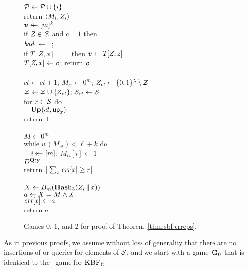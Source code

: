 \begin{figure*}
{  \\[2pt]
    $\mathcal{P} \gets \mathcal{P} \cup \{i\}$\\
    return $\langle M_i, Z_i\rangle$
}
{
  \vspace{-7pt}
  \hfill{}\\[2pt]
    $\boldsymbol{v} \mathrel{\leftarrow\mkern-14mu\leftarrow} [m]^k$\\
    if $Z \in \mathcal{Z}$ and $c = 1$ then \\
    \tab $\textit{bad}_1 \gets 1$; \\
    if $T[Z,x] = \bot$ then $\boldsymbol{v} \gets T[Z,z]$\\
    $T[Z,x] \gets \boldsymbol{v}$; return $\boldsymbol{v}$
  \\[6pt]
  \oraclev{$\REPO(\col)$}\hfill{}\\[2pt]
    $ct \gets ct+1$;
    $M_{ct} \gets 0^m$;
    $Z_{ct} \gets \{0,1\}^\lambda\setminus \mathcal{Z}$\\
    $\mathcal{Z} \gets \mathcal{Z} \cup \{Z_{ct}\}$;
    $\mathcal{S}_{ct} \gets \mathcal{S}$\\
    for $x \in \mathcal{S}$ do\\
    $\hspace*{10pt}\textup{\textbf{Up}}\hspace{0.5pt}(ct, \mathsf{up}_x)$\\
    return $\top$
  \\[6pt]
  \\[2pt]
    $M \gets 0^m$\\
    while $w(M_{ct}) < \ell+k$ do\\
    $\hspace*{10pt} i \mathrel{\leftarrow\mkern-14mu\leftarrow} [m]$;
    $M_{ct}[i] \gets 1$\\
    $D^{\textup{\textbf{Qry}}\hspace{0.5pt}}$\\
    return $\big[\sum_x \textit{err}[x] \geq r\big]$
  \\[6pt]
  \\[2pt]
    $X \gets {B}_m(\textup{\textbf{Hash}}\hspace{0.5pt}_3(Z_i \, \| \, x))$\\
    $a \gets X = M \wedge X$\\
    $\textit{err}[x] \gets a$\\
    return $a$
}
\caption{Games 0, 1, and 2 for proof of Theorem~\ref{thm:sbf-erreps}.}
\label{fig:sbf-erreps/games}
\end{figure*}

As in previous proofs, we assume without loss of generality that there are no insertions of or queries for elements of $\mathcal{S}$, and we start with a game~$\textup{\textbf{G}}\hspace{0.5pt}_0$ that is identical to the \erreps\ game for $\textnormal{\textsc{KBF}}_\mathrm{ft}$.

